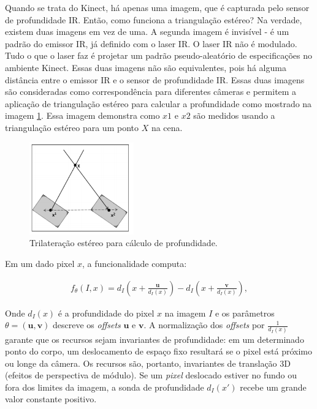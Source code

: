 Quando se trata do Kinect, há apenas uma imagem, que é capturada pelo sensor de profundidade IR. Então, como funciona a triangulação estéreo? Na verdade, existem duas imagens em vez de uma. A segunda imagem é invisível - é um padrão do emissor IR, já definido com o laser IR. O laser IR não é modulado. Tudo o que o laser faz é projetar um padrão pseudo-aleatório de especificações no ambiente Kinect. Essas duas imagens não são equivalentes, pois há alguma distância entre o emissor IR e o sensor de profundidade IR. Essas duas imagens são consideradas como correspondência para diferentes câmeras e permitem a aplicação de triangulação estéreo para calcular a profundidade como mostrado na imagem \ref{fig:trilatStereo}. Essa imagem demonstra como $x1$ e $x2$ são medidos usando a triangulação estéreo para um ponto $X$ na cena. 

\begin{figure}[!h]
\centering
\includegraphics[width=0.4\textwidth]{images/trilateracao_estereo.png}
\caption{Trilateração estéreo para cálculo de profundidade.}
\label{fig:trilatStereo}
\end{figure}

Em um dado pixel $x$, a funcionalidade computa: 


\begin{align}
{f_{\theta}}(I, x) = d_{I}  \left(x + \frac{\boldsymbol{u}}{d_{I}(x)}\right) -  d_{I} \left(x + \frac{\boldsymbol{v}}{d_{I}(x)}\right) ,
\label{eq1}
\end{align}

Onde $d_{I}(x)$ é a profundidade do pixel $x$ na imagem $I$ e os parâmetros $\theta = (\boldsymbol{u,v})$ descreve os \textit{offsets} $\boldsymbol{u}$ e $\boldsymbol{v}$. A normalização dos \textit{offsets} por $\frac{1}{d_{I}(x)}$ garante que os recursos sejam invariantes de profundidade: em um determinado ponto do corpo, um deslocamento de espaço fixo resultará se o pixel está próximo ou longe da câmera. Os recursos são, portanto, invariantes de translação 3D (efeitos de perspectiva de módulo). Se um \textit{pixel} deslocado estiver no fundo ou fora dos limites da imagem, a sonda de profundidade $d_{I}(x')$ recebe um grande valor constante positivo.

